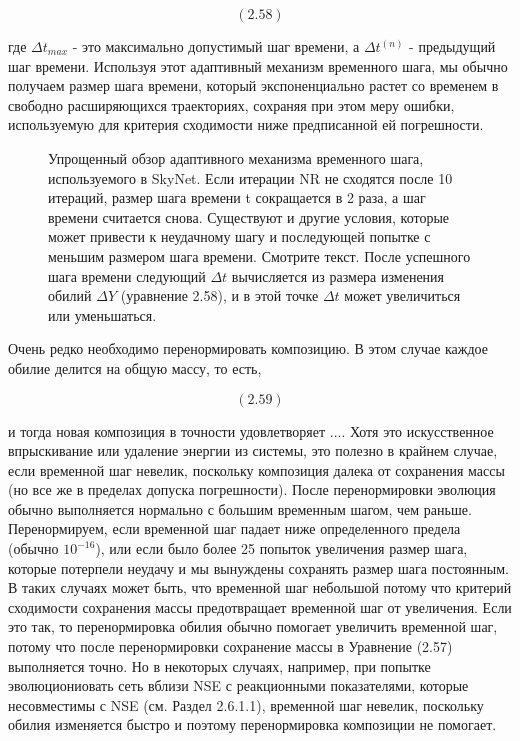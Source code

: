 \documentclass[%
bachelor,    %
natbib,      %
subf,        %
href,        %
colorlinks,  %
]{disser}
\begin{document}
$$(2.58)$$

где $\Delta t_{max}$ - это максимально допустимый шаг времени, а $\Delta t^{(n)}$ - предыдущий шаг времени. Используя этот адаптивный механизм временного шага, мы обычно получаем размер шага времени, который экспоненциально растет со временем в свободно расширяющихся траекториях, сохраняя при этом меру ошибки, используемую для критерия сходимости ниже предписанной ей погрешности.

\begin{figure}[h]
	\caption{Упрощенный обзор адаптивного механизма временного шага, используемого в SkyNet. Если итерации NR не сходятся после 10 итераций, размер шага времени t сокращается в 2 раза, а шаг времени считается снова. Существуют и другие условия, которые может привести к неудачному шагу и последующей попытке с меньшим размером шага времени. Смотрите текст. После успешного шага времени следующий $\Delta t$ вычисляется из размера изменения обилий $\Delta Y$ (уравнение 2.58), и в этой точке $\Delta t$ может увеличиться или уменьшаться.}
	\label{ris:22}
\end{figure}

Очень редко необходимо перенормировать композицию. В этом случае каждое
обилие делится на общую массу, то есть,

$$(2.59)$$

и тогда новая композиция в точности удовлетворяет $...$. Хотя это искусственное впрыскивание или удаление энергии из системы, это полезно в крайнем случае, если временной шаг невелик, поскольку композиция далека от сохранения массы (но все же в пределах допуска погрешности). После перенормировки эволюция обычно выполняется нормально с большим временным шагом, чем раньше. Перенормируем, если временной шаг падает ниже определенного предела (обычно $10^{-16}$), или если было более 25 попыток увеличения размер шага, которые потерпели неудачу и  мы вынуждены сохранять размер шага постоянным. В таких случаях может быть, что временной шаг небольшой потому что критерий сходимости сохранения массы предотвращает временной шаг от увеличения. Если это так, то перенормировка обилия обычно помогает увеличить временной шаг, потому что после перенормировки сохранение массы в Уравнение (2.57) выполняется точно. Но в некоторых случаях, например, при попытке эволюциониовать сеть вблизи NSE с реакционными показателями, которые несовместимы с NSE (см. Раздел 2.6.1.1), временной шаг невелик, поскольку обилия изменяется быстро и поэтому перенормировка композиции не помогает.
\end{document}
